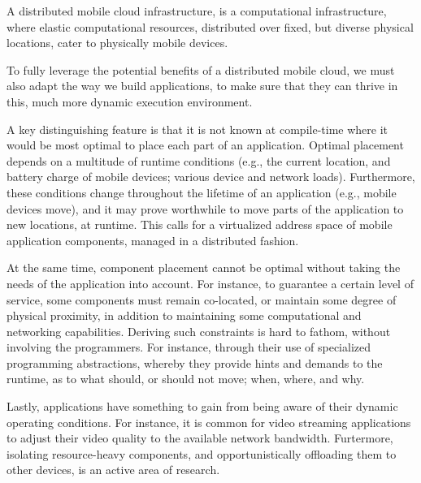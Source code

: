 \begin{definition}

\label{def:mobile-cloud}

A distributed mobile cloud infrastructure, is a computational
infrastructure, where elastic computational resources, distributed
over fixed, but diverse physical locations, cater to physically mobile
devices.

\end{definition}

To fully leverage the potential benefits of a distributed mobile
cloud, we must also adapt the way we build applications, to make sure
that they can thrive in this, much more dynamic execution
environment\cite{2014-A-Survey-of-MCC-Application-Models,
2015-Distributed-Cloud-Dagstuhl,
2019-ETSI-Developing-Software-for-MEC}.

A key distinguishing feature is that it is not known at compile-time
where it would be most optimal to place each part of an application.
Optimal placement depends on a multitude of runtime conditions (e.g.,
the current location, and battery charge of mobile devices; various
device and network loads). Furthermore, these conditions change
throughout the lifetime of an application (e.g., mobile devices move),
and it may prove worthwhile to move parts of the application to new
locations, at runtime. This calls for a virtualized address space of
mobile application components, managed in a distributed fashion.

At the same time, component placement cannot be optimal without taking
the needs of the application into account. For instance, to guarantee
a certain level of service, some components must remain co-located, or
maintain some degree of physical proximity, in addition to maintaining
some computational and networking capabilities.  Deriving such
constraints is hard to fathom, without involving the programmers. For
instance, through their use of specialized programming abstractions,
whereby they provide hints and demands to the runtime, as to what
should, or should not move; when, where, and why.

Lastly, applications have something to gain from being aware of their
dynamic operating conditions. For instance, it is common for video
streaming applications to adjust their video quality to the available
network bandwidth. Furtermore, isolating resource-heavy components,
and opportunistically offloading them to other devices, is an active
area of research\cite{2013-mobile-computation-offloading}.

